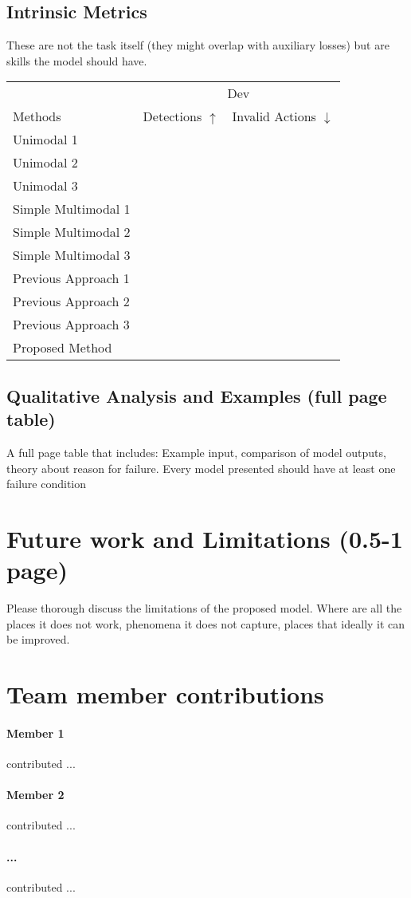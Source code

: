 \documentclass[11pt,a4paper]{article}
\begin{document}
\subsection{Intrinsic Metrics}
These are not the task itself (they might overlap with auxiliary losses) but are skills the model should have.
\begin{table}[t]
\centering
\begin{tabular}{@{}lrr@{}}
\toprule
                            & \multicolumn{2}{c}{Dev} \\
Methods                     & Detections $\uparrow$ & Invalid Actions $\downarrow$  \\
\midrule
Unimodal 1 \cite{} & & \\
Unimodal 2 \cite{} & & \\
Unimodal 3 \cite{} & & \\
\midrule
Simple Multimodal 1 \cite{} & &  \\
Simple Multimodal 2 \cite{} & &  \\
Simple Multimodal 3 \cite{} & &  \\
\midrule
Previous Approach 1 \cite{} & &  \\
Previous Approach 2 \cite{} & &  \\
Previous Approach 3 \cite{} & &  \\
\midrule
Proposed Method             & &  \\
\bottomrule
\end{tabular}
\end{table}

\clearpage
\subsection{Qualitative Analysis and Examples (full page table)}
A full page table that includes: Example input, comparison of model outputs, theory about reason for failure. Every model presented should have at least one failure condition

\clearpage
\section{Future work and Limitations (0.5-1 page)}
Please thorough discuss the limitations of the proposed model.  Where are all the places it does not work, phenomena it does not capture, places that ideally it can be improved.

\clearpage
\section{Team member contributions}
\paragraph{Member 1} contributed ...

\paragraph{Member 2} contributed ...

\paragraph{...} contributed ...





\end{document}
